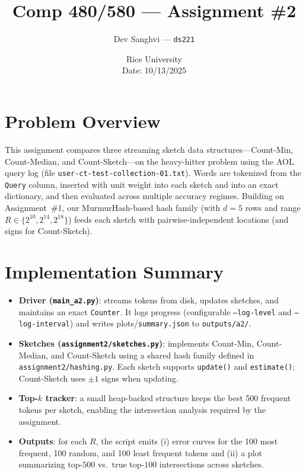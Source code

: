 \documentclass[11pt]{article}
\title{Comp 480/580 --- Assignment \#2}
\author{Dev Sanghvi --- \texttt{ds221}}
\date{Rice University \\ Date: 10/13/2025}
\begin{document}
\maketitle

\section*{Problem Overview}
This assignment compares three streaming sketch data structures---Count-Min, Count-Median, and Count-Sketch---on the heavy-hitter problem using the AOL query log (file \texttt{user-ct-test-collection-01.txt}). Words are tokenized from the \texttt{Query} column, inserted with unit weight into each sketch and into an exact dictionary, and then evaluated across multiple accuracy regimes. Building on Assignment~\#1, our MurmurHash-based hash family (with $d=5$ rows and range $R\in\{2^{10},2^{14},2^{18}\}$) feeds each sketch with pairwise-independent locations (and signs for Count-Sketch).

\section{Implementation Summary}
\begin{itemize}
  \item \textbf{Driver (\texttt{main\_a2.py})}: streams tokens from disk, updates sketches, and maintains an exact \texttt{Counter}. It logs progress (configurable \texttt{--log-level} and \texttt{--log-interval}) and writes plots/\texttt{summary.json} to \texttt{outputs/a2/}.
  \item \textbf{Sketches (\texttt{assignment2/sketches.py})}: implements Count-Min, Count-Median, and Count-Sketch using a shared hash family defined in \texttt{assignment2/hashing.py}. Each sketch supports \texttt{update()} and \texttt{estimate()}; Count-Sketch uses $\pm1$ signs when updating.
  \item \textbf{Top-$k$ tracker}: a small heap-backed structure keeps the best 500 frequent tokens per sketch, enabling the intersection analysis required by the assignment.
  \item \textbf{Outputs}: for each $R$, the script emits (i) error curves for the 100 most frequent, 100 random, and 100 least frequent tokens and (ii) a plot summarizing top-$500$ vs.\ true top-$100$ intersections across sketches.
\end{itemize}
\end{document}
